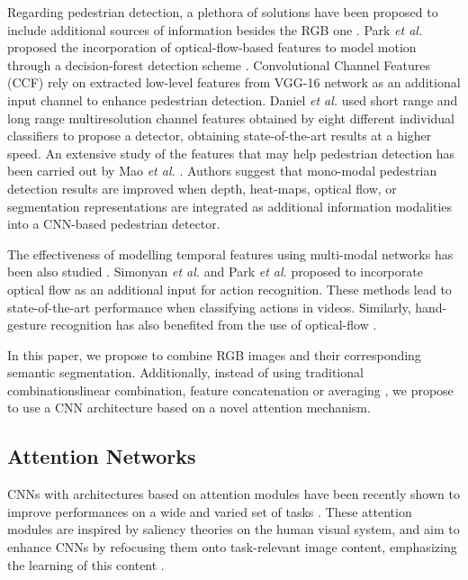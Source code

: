 \documentclass[review, 3p, sort&compress]{elsarticle}
\begin{document}
Regarding pedestrian detection, a plethora of solutions have been proposed to include additional sources of information besides the RGB one \cite{park2013exploring, yang2015convolutional, daniel2016semantic, mao2017can}. Park \textit{et al.} proposed the incorporation of optical-flow-based features to model motion through a decision-forest detection scheme \cite{park2013exploring}. Convolutional Channel Features (CCF) \cite{yang2015convolutional} rely on extracted low-level features from VGG-16 network as an additional input channel to enhance pedestrian detection. Daniel \textit{et al.} \cite{daniel2016semantic} used short range and long range multiresolution channel features obtained by eight different individual classifiers to propose a detector, obtaining state-of-the-art results at a higher speed. An extensive study of the features that may help pedestrian detection has been carried out by Mao \textit{et al.} \cite{mao2017can}. Authors suggest that mono-modal pedestrian detection results are improved when depth, heat-maps, optical flow, or segmentation representations are integrated as additional information modalities into a CNN-based pedestrian detector.

The effectiveness of modelling temporal features using multi-modal networks has been also studied \cite{simonyan2014two, park2016combining}. Simonyan \textit{et al.} \cite{simonyan2014two} and Park \textit{et al.} \cite{park2016combining} proposed to incorporate optical flow as an additional input for action recognition. These methods lead to state-of-the-art performance when classifying actions in videos. Similarly, hand-gesture recognition has also benefited from the use of optical-flow \cite{abavisani2018improving}.

In this paper, we propose to combine RGB images and their corresponding semantic segmentation. Additionally, instead of using traditional combinations\textemdash linear combination, feature concatenation or averaging \cite{simonyan2014two, park2016combining,mao2017can}, we propose to use a CNN architecture based on a novel attention mechanism.

\subsection{Attention Networks}
CNNs with architectures based on attention modules have been recently shown to improve performances on a wide and varied set of tasks \cite{gregor2015draw}. These attention modules are inspired by saliency theories on the human visual system, and aim to enhance CNNs by refocusing them onto task-relevant image content, emphasizing the learning of this content \cite{woo2018cbam}.
\end{document}
